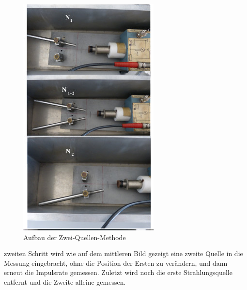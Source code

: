 \begin{figure}[H]
    \centering
    \includegraphics[width=\linewidth]{images/quelle.jpg}
    \caption{Aufbau der Zwei-Quellen-Methode}
    \label{fig:6}
\end{figure}
\justifying zweiten Schritt wird wie auf dem mittleren Bild gezeigt eine zweite Quelle in
die Messung eingebracht, ohne die Position der Ersten zu verändern, und dann
erneut die Impulsrate gemessen. Zuletzt wird noch die erste Strahlungsquelle
entfernt und die Zweite alleine gemessen.

